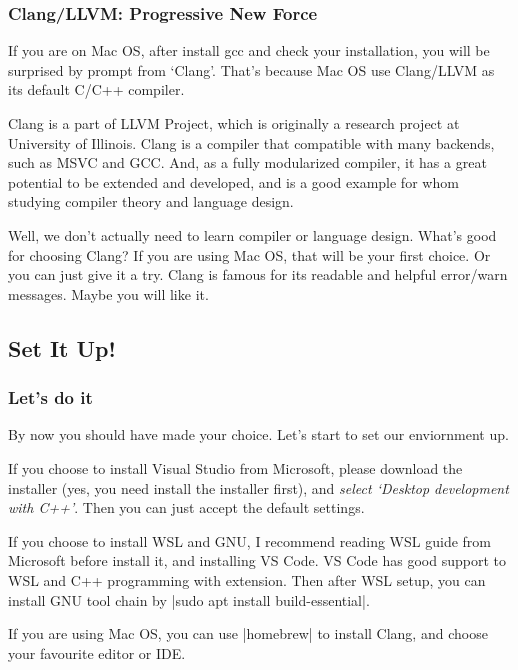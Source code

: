 \documentclass[compress,xcolor={dvipsnames}]{beamer}
\begin{document}
\begin{frame}
    \frametitle{Clang/LLVM: Progressive New Force}
    If you are on Mac OS, after install gcc and check your installation, you will be surprised by prompt from `Clang'. That's because Mac OS use Clang/LLVM as its default C/C++ compiler.
    \pause

    Clang is a part of LLVM Project, which is originally a research project at University of Illinois. Clang is a compiler that compatible with many backends, such as MSVC and GCC. And, as a fully modularized compiler, it has a great potential to be extended and developed, and is a good example for whom studying compiler theory and language design.
    \pause

    Well, we don't actually need to learn compiler or language design. What's good for choosing Clang? If you are using Mac OS, that will be your first choice. Or you can just give it a try. Clang is famous for its readable and helpful error/warn messages. Maybe you will like it.
\end{frame}
\subsection{Set It Up!}
\begin{frame}[fragile]
    \frametitle{Let's do it}

    By now you should have made your choice. Let's start to set our enviornment up.
    \pause

    If you choose to install Visual Studio from Microsoft, please download the installer (yes, you need install the installer first), and \emph{select `Desktop development with C++'}. Then you can just accept the default settings.
    \pause

    If you choose to install WSL and GNU, I recommend reading WSL guide from Microsoft before install it, and installing VS Code. VS Code has good support to WSL and C++ programming with extension. Then after WSL setup, you can install GNU tool chain by \cverb|sudo apt install build-essential|.
    \pause

    If you are using Mac OS, you can use \cverb|homebrew| to install Clang, and choose your favourite editor or IDE.

\end{frame}
\end{document}
